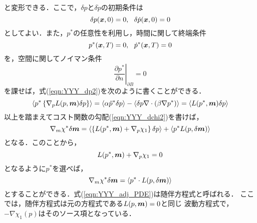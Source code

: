 と変形できる．ここで，$\delta p$と$\delta \dot{p}$の初期条件は
\begin{equation}
	\delta p(\mbox{\boldmath $x$},0)=0, \ \ \delta \dot{p} (\mbox{\boldmath $x$},0)=0
	\label{eqn:YYY_11}
\end{equation}
としてよい．また，$p^*$の任意性を利用し，時間に関して終端条件
\begin{equation}
	p^*(\fat{x},T)=0, \ \ \dot{p}^*(\fat{x},T)=0 
	\label{eqn:YYY_12}
\end{equation}
を，空間に関してノイマン条件
\begin{equation}
	\left. \frac{\partial p^*}{\partial n}
	\right|_{\partial B}=0
	\label{eqn:yyy_13}
\end{equation}
を課せば，式(\ref{eqn:YYY_dp2})を次のように書くことができる．
\begin{equation}
	\left< p^*  \left\{ \nabla_p L(p,\mbox{\boldmath $m$})\delta p \right\} \right> 
	=
	\left< \alpha \ddot{p}^* \delta p\right>
	-
	\left<
		\delta p \nabla\cdot \left( \beta \nabla p^* \right)
	\right>
	=
	\left< L(p^*,\mbox{\boldmath $m$}) \delta p\right> 
	\label{eqn:YYY_14}
\end{equation}
以上を踏まえてコスト関数の勾配(\ref{eqn:YYY_dchi2})を書けば，
\begin{equation}
	\nabla_m \chi^* \delta \mbox{\boldmath $m$}
	=
	\left< 
		\left\{L(p^*,\mbox{\boldmath $m$})+\nabla_p\chi_1\right\} \delta p
	\right>
	+
	\left< p^*  L(p,\delta \mbox{\boldmath $m$}) \right> 
	\label{eqn:YYY_dchi2_adj}
\end{equation}
となる．このことから，
\begin{equation}
	L(p^*,\mbox{\boldmath $m$})+\nabla_p\chi_1=0
	\label{eqn:YYY_adj_PDE}
\end{equation}
となるように$p^*$を選べば，
\begin{equation}
	\nabla_m \chi^* \delta \mbox{\boldmath $m$}
	=
	\left< p^*  \cdot L(p,\delta \mbox{\boldmath $m$}) \right> 
	\label{eqn:YYY_gradX0}
\end{equation}
とすることができる．式(\ref{eqn:YYY_adj_PDE})は随伴方程式と呼ばれる．
ここでは，随伴方程式は元の方程式である$L(p,\mbox{\boldmath $m$})=0$と同じ
波動方程式で，$-\nabla \chi_1(p)$はそのソース項となっている．

